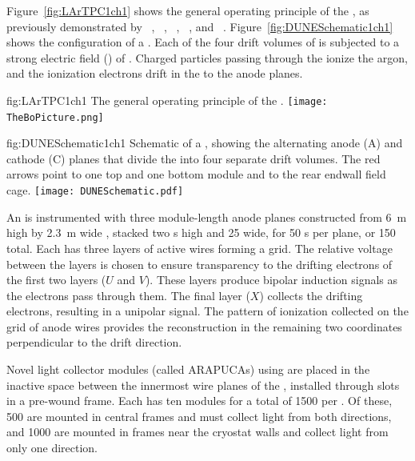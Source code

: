 Figure~\ref{fig:LArTPC1ch1} shows the general operating principle of the  , as previously demonstrated by  ~\cite{Icarus-T600}, ~\cite{microboone}, ~\cite{Anderson:2012vc}, ~\cite{Cavanna:2014iqa}, and ~\cite{Abi:2017aow}. Figure~\ref{fig:DUNESchematic1ch1} shows the configuration of a  . Each of the four drift volumes of  is subjected to a strong electric field (\efield{}) of \spmaxfield. Charged particles passing through the  ionize the argon, and the ionization electrons drift in the \efield to the anode planes. 


\begin{dunefigure}{fig:LArTPC1ch1}
{The general operating principle of the  .}
\texttt{[image: TheBoPicture.png]} 
\end{dunefigure}

\begin{dunefigure}{fig:DUNESchematic1ch1}
{Schematic of a \nominalmodsize {}  , showing the alternating anode (A) and cathode (C) planes that divide the  into four separate drift volumes. The red arrows point to one top and one bottom  module and to the rear endwall field cage.}
\texttt{[image: DUNESchematic.pdf]}
\end{dunefigure}

An  is instrumented with three module-length anode planes constructed from \SI{6}{m} high by \SI{2.3}{m} wide , stacked two s high and 25 wide, for 50 s per plane, or 150 total. Each  has three layers of active wires forming a grid. The relative voltage between the layers is chosen to ensure transparency to the drifting electrons of the first two layers ($U$ and $V$). These layers produce bipolar induction signals as the electrons pass through them. The final layer ($X$) collects the drifting electrons, resulting in a unipolar signal. The pattern of ionization collected on the grid of anode wires provides the reconstruction in the remaining two coordinates perpendicular to the drift direction.



Novel  light collector modules (called ARAPUCAs) using  are placed in the inactive space between the innermost wire planes of the , installed through slots in a pre-wound  frame. 
Each  has ten  modules for a total of \num{1500} per .  Of these, \num{500} are mounted in central  frames and must collect light from both directions, 
and \num{1000} are mounted in frames  near the %
cryostat walls and collect light from only one direction. 

